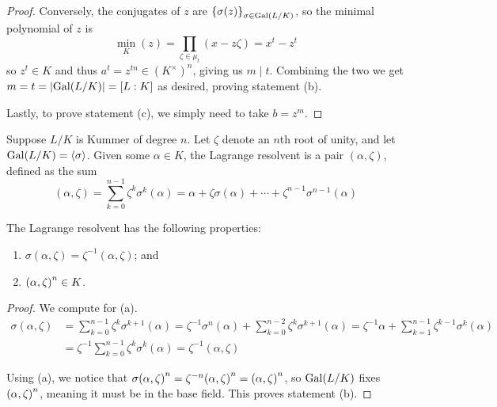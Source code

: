 \begin{proof}
    Conversely, the conjugates of \(z\) are \({\{\sigma(z)\}}_{\sigma\in\operatorname{Gal}(L/K)}\),
    so the minimal polynomial of \(z\) is
    \[\textstyle\min_K(z) = \displaystyle\prod_{\zeta\in\mu_t} (x - z\zeta) = x^t - z^t\]
    so \(z^t \in K\) and thus \(a^t = z^{tn} \in {(K^\times)}^n\), giving us \(m \mid t\).
    Combining the two we get \(m = t = \abs{\operatorname{Gal}(L/K)} = [L:K]\) as desired,
    proving statement (b).

    \medskip

    Lastly, to prove statement (c), we simply need to take \(b = z^m\).
\end{proof}

\begin{definition}
    Suppose \(L/K\) is Kummer of degree \(n\).
    Let \(\zeta\) denote an \(n\)th root of unity, and let \(\operatorname{Gal}(L/K) = \left\langle\sigma\right\rangle\).
    Given some \(\alpha \in K\), the Lagrange resolvent is a pair \((\alpha,\zeta)\),
    defined as the sum
    \begin{equation*}
        (\alpha,\zeta) = \sum_{k=0}^{n-1} \zeta^k \sigma^k(\alpha)
        = \alpha + \zeta\sigma(\alpha) + \cdots + \zeta^{n-1}\sigma^{n-1}(\alpha)
    \end{equation*}
\end{definition}
\begin{lemma}\label{lem:lagrange-resolvent-properties}
    The Lagrange resolvent has the following properties:
    \begin{enumerate}[label={(\alph*)}, itemsep=0mm]
        \item \(\sigma(\alpha,\zeta) = \zeta^{-1}(\alpha,\zeta)\); and
        \item \(\pqty{\alpha,\zeta}^n \in K\).
    \end{enumerate}
\end{lemma}
\begin{proof}
    We compute for (a).
    \begin{align*}
        \sigma(\alpha,\zeta) &= \sum_{k=0}^{n-1} \zeta^k \sigma^{k+1}(\alpha)
        = \zeta^{-1}\sigma^n(\alpha) + \sum_{k=0}^{n-2} \zeta^k \sigma^{k+1}(\alpha)
        = \zeta^{-1}\alpha + \sum_{k=1}^{n-1} \zeta^{k-1} \sigma^k(\alpha) \\
        &= \zeta^{-1}\sum_{k=0}^{n-1} \zeta^k \sigma^k(\alpha)
        = \zeta^{-1}(\alpha,\zeta)
    \end{align*}

    Using (a), we notice that \(\sigma\pqty{\alpha,\zeta}^n = \zeta^{-n}\pqty{\alpha,\zeta}^n = \pqty{\alpha,\zeta}^n\),
    so \(\operatorname{Gal}(L/K)\) fixes \(\pqty{\alpha,\zeta}^n\), meaning it must be in the base field.
    This proves statement (b).
\end{proof}
